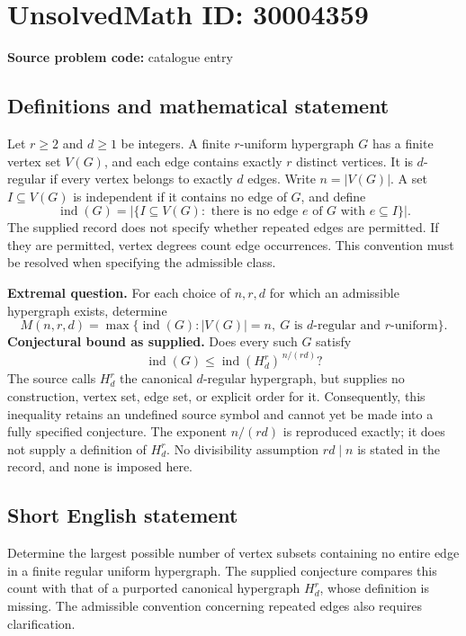 \documentclass[11pt]{article}
\begin{document}
\section*{UnsolvedMath ID: 30004359}
\textbf{Source problem code:} catalogue entry
\subsection{Definitions and mathematical statement}
Let \(r\geq 2\) and \(d\geq 1\) be integers. A finite \(r\)-uniform hypergraph \(G\) has a finite vertex set \(V(G)\), and each edge contains exactly \(r\) distinct vertices. It is \(d\)-regular if every vertex belongs to exactly \(d\) edges. Write \(n=|V(G)|\). A set \(I\subseteq V(G)\) is independent if it contains no edge of \(G\), and define
\[
\operatorname{ind}(G)=\bigl|\{I\subseteq V(G):\text{ there is no edge }e\text{ of }G\text{ with }e\subseteq I\}\bigr|.
\]
The supplied record does not specify whether repeated edges are permitted. If they are permitted, vertex degrees count edge occurrences. This convention must be resolved when specifying the admissible class.

\textbf{Extremal question.} For each choice of \(n,r,d\) for which an admissible hypergraph exists, determine
\[
M(n,r,d)=\max\bigl\{\operatorname{ind}(G): |V(G)|=n,\ G\text{ is }d\text{-regular and }r\text{-uniform}\bigr\}.
\]
\textbf{Conjectural bound as supplied.} Does every such \(G\) satisfy
\[
\operatorname{ind}(G)\leq \operatorname{ind}(H_d^r)^{\,n/(rd)}?
\]
The source calls \(H_d^r\) the canonical \(d\)-regular hypergraph, but supplies no construction, vertex set, edge set, or explicit order for it. Consequently, this inequality retains an undefined source symbol and cannot yet be made into a fully specified conjecture. The exponent \(n/(rd)\) is reproduced exactly; it does not supply a definition of \(H_d^r\). No divisibility assumption \(rd\mid n\) is stated in the record, and none is imposed here.
\subsection{Short English statement}
Determine the largest possible number of vertex subsets containing no entire edge in a finite regular uniform hypergraph. The supplied conjecture compares this count with that of a purported canonical hypergraph \(H_d^r\), whose definition is missing. The admissible convention concerning repeated edges also requires clarification.
\end{document}
